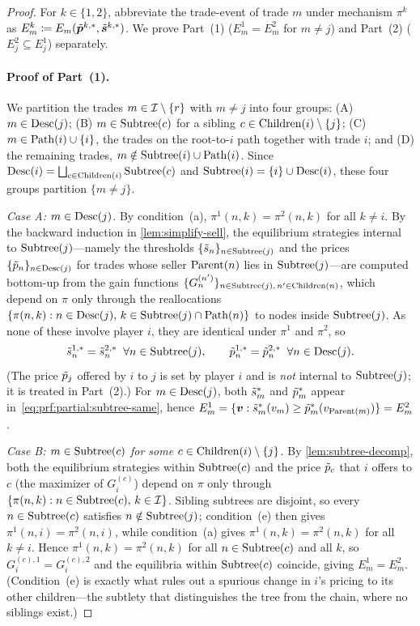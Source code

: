 \begin{proof}
For $k \in \{1, 2\}$, abbreviate the trade-event of trade $m$ under mechanism $\pi^k$ as $E^k_m \coloneqq E_m(\tilde{{\bm{p}}}^{k,*}, \tilde{{\bm{s}}}^{k,*})$. We prove Part~(1) ($E^1_m = E^2_m$ for $m \neq j$) and Part~(2) ($E^2_j \subseteq E^1_j$) separately.

\paragraph{Proof of Part~(1).}
We partition the trades $m \in \mathcal{I} \setminus \{r\}$ with $m \neq j$ into four groups: (A) $m \in \operatorname{Desc}(j)$; (B) $m \in \operatorname{Subtree}(c)$ for a sibling $c \in \operatorname{Children}(i) \setminus \{j\}$; (C) $m \in \operatorname{Path}(i) \cup \{i\}$, the trades on the root-to-$i$ path together with trade $i$; and (D) the remaining trades, $m \notin \operatorname{Subtree}(i) \cup \operatorname{Path}(i)$. Since $\operatorname{Desc}(i) = \bigsqcup_{c \in \operatorname{Children}(i)} \operatorname{Subtree}(c)$ and $\operatorname{Subtree}(i) = \{i\} \cup \operatorname{Desc}(i)$, these four groups partition $\{m \neq j\}$.

\emph{Case A: $m \in \operatorname{Desc}(j)$.}
By condition~(a), $\pi^1(n, k) = \pi^2(n, k)$ for all $k \neq i$. By the backward induction in \cref{lem:simplify-sell}, the equilibrium strategies internal to $\operatorname{Subtree}(j)$---namely the thresholds $\{\tilde{s}_n\}_{n \in \operatorname{Subtree}(j)}$ and the prices $\{\tilde{p}_n\}_{n \in \operatorname{Desc}(j)}$ for trades whose seller $\operatorname{Parent}(n)$ lies in $\operatorname{Subtree}(j)$---are computed bottom-up from the gain functions $\{G^{(n')}_n\}_{n \in \operatorname{Subtree}(j),\, n' \in \operatorname{Children}(n)}$, which depend on $\pi$ only through the reallocations $\{\pi(n, k) : n \in \operatorname{Desc}(j),\, k \in \operatorname{Subtree}(j) \cap \operatorname{Path}(n)\}$ to nodes inside $\operatorname{Subtree}(j)$. As none of these involve player $i$, they are identical under $\pi^1$ and $\pi^2$, so
\begin{equation}
\label{eq:prf:partial:subtree-same}
\tilde{s}^{1,*}_n = \tilde{s}^{2,*}_n \;\; \forall n \in \operatorname{Subtree}(j), \qquad \tilde{p}^{1,*}_n = \tilde{p}^{2,*}_n \;\; \forall n \in \operatorname{Desc}(j).
\end{equation}
(The price $\tilde{p}_j$ offered by $i$ to $j$ is set by player $i$ and is \emph{not} internal to $\operatorname{Subtree}(j)$; it is treated in Part~(2).) For $m \in \operatorname{Desc}(j)$, both $\tilde{s}^*_m$ and $\tilde{p}^*_m$ appear in~\eqref{eq:prf:partial:subtree-same}, hence $E^1_m = \{{\bm{v}} : \tilde{s}^*_m(v_m) \ge \tilde{p}^*_m(v_{\operatorname{Parent}(m)})\} = E^2_m$.

\emph{Case B: $m \in \operatorname{Subtree}(c)$ for some $c \in \operatorname{Children}(i) \setminus \{j\}$.}
By \cref{lem:subtree-decomp}, both the equilibrium strategies within $\operatorname{Subtree}(c)$ and the price $\tilde{p}_c$ that $i$ offers to $c$ (the maximizer of $G^{(c)}_i$) depend on $\pi$ only through $\{\pi(n, k) : n \in \operatorname{Subtree}(c),\, k \in \mathcal{I}\}$. Sibling subtrees are disjoint, so every $n \in \operatorname{Subtree}(c)$ satisfies $n \notin \operatorname{Subtree}(j)$; condition~(e) then gives $\pi^1(n, i) = \pi^2(n, i)$, while condition~(a) gives $\pi^1(n, k) = \pi^2(n, k)$ for all $k \neq i$. Hence $\pi^1(n, k) = \pi^2(n, k)$ for all $n \in \operatorname{Subtree}(c)$ and all $k$, so $G^{(c),1}_i = G^{(c),2}_i$ and the equilibria within $\operatorname{Subtree}(c)$ coincide, giving $E^1_m = E^2_m$. (Condition~(e) is exactly what rules out a spurious change in $i$'s pricing to its other children---the subtlety that distinguishes the tree from the chain, where no siblings exist.)


\end{proof}
